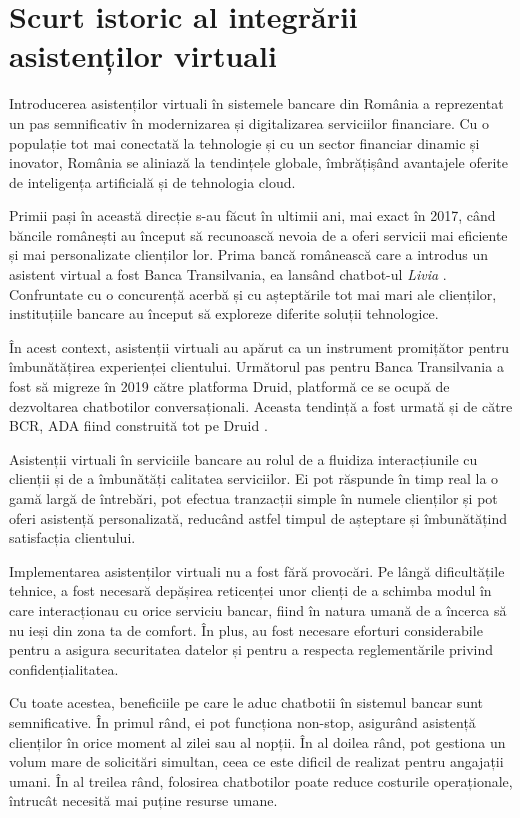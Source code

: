 \section{Scurt istoric al integrării asistenților virtuali}

Introducerea asistenților virtuali în sistemele bancare din România a reprezentat un pas semnificativ în modernizarea și digitalizarea serviciilor financiare. Cu o populație tot mai conectată la tehnologie și cu un sector financiar dinamic și inovator, România se aliniază la tendințele globale, îmbrățișând avantajele oferite de inteligența artificială și de tehnologia cloud.

Primii pași în această direcție s-au făcut în ultimii ani, mai exact în 2017, când băncile românești au început să recunoască nevoia de a oferi servicii mai eficiente și mai personalizate clienților lor. Prima bancă românească care a introdus un asistent virtual a fost Banca Transilvania, ea lansând chatbot-ul \emph{Livia} \cite{first-chatbot}. Confruntate cu o concurență acerbă și cu așteptările tot mai mari ale clienților, instituțiile bancare au început să exploreze diferite soluții tehnologice. 

În acest context, asistenții virtuali au apărut ca un instrument promițător pentru îmbunătățirea experienței clientului. Următorul pas pentru Banca Transilvania a fost să migreze în 2019 către platforma Druid, platformă ce se ocupă de dezvoltarea chatbotilor conversaționali. Aceasta tendință a fost urmată și de către BCR, ADA fiind construită tot pe Druid \cite{ADA}.

Asistenții virtuali în serviciile bancare au rolul de a fluidiza interacțiunile cu clienții și de a îmbunătăți calitatea serviciilor. Ei pot răspunde în timp real la o gamă largă de întrebări, pot efectua tranzacții simple în numele clienților și pot oferi asistență personalizată, reducând astfel timpul de așteptare și îmbunătățind satisfacția clientului.

Implementarea asistenților virtuali nu a fost fără provocări. Pe lângă dificultățile tehnice, a fost necesară depășirea reticenței unor clienți de a schimba modul în care interacționau cu orice serviciu bancar, fiind în natura umană de a încerca să nu ieși din zona ta de comfort. În plus, au fost necesare eforturi considerabile pentru a asigura securitatea datelor și pentru a respecta reglementările privind confidențialitatea.

Cu toate acestea, beneficiile pe care le aduc chatbotii în sistemul bancar sunt semnificative. În primul rând, ei pot funcționa non-stop, asigurând asistență clienților în orice moment al zilei sau al nopții. În al doilea rând, pot gestiona un volum mare de solicitări simultan, ceea ce este dificil de realizat pentru angajații umani. În al treilea rând, folosirea chatbotilor poate reduce costurile operaționale, întrucât necesită mai puține resurse umane.

